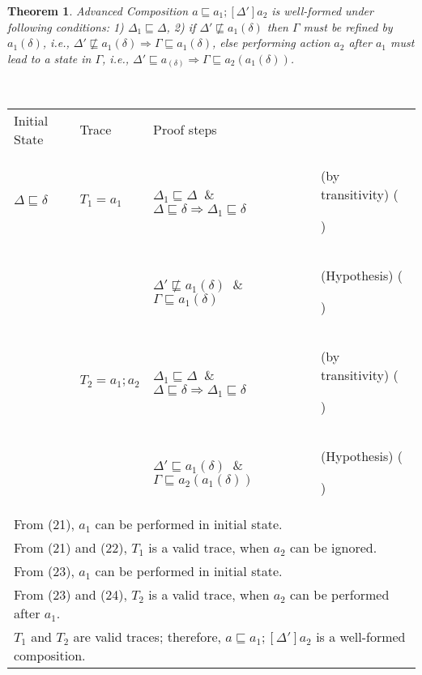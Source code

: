 \documentclass[12pt,journal,letterpaper,onecolumn]{IEEEtran}
\newcounter{myCounter}
\renewcommand{\themyCounter}{\arabic{myCounter}\addtocounter{myCounter}{1}}
\newtheorem{theorem}{Theorem}[section]
\begin{document}
\begin{theorem}
Advanced Composition $a\sqsubseteq a_1;[\Delta']a_2$ is well-formed
under following conditions: 1) $\Delta_1 \sqsubseteq \Delta$, 2) if
$\Delta' \not \sqsubseteq a_1(\delta)$ then $\Gamma$ must be refined
by $a_1(\delta)$, i.e., $\Delta' \not \sqsubseteq a_1(\delta)
\Rightarrow \Gamma \sqsubseteq a_1(\delta)$, else performing action
$a_2$ after $a_1$ must lead to a state in $\Gamma$, i.e., $\Delta'
\sqsubseteq a_(\delta) \Rightarrow \Gamma \sqsubseteq
a_2(a_1(\delta))$. \label{theorem:advancedseq} \end{theorem}
\\
\begin{minipage}{6in} \begin{center}
\begin{tabular}{llp{7.5cm}p{3.8cm}}
Initial State & Trace &  Proof steps & \\
$\Delta \sqsubseteq \delta$ & $T_1 = a_1$ & $\Delta_1 \sqsubseteq \Delta $ $~\&~$ $ \Delta \sqsubseteq \delta \Rightarrow \Delta_1 \sqsubseteq \delta $& (by transitivity) \hfill(\themyCounter) \\
& & $\Delta' \not \sqsubseteq a_1(\delta)$ $~\&~$ $\Gamma \sqsubseteq a_1(\delta)$ & (Hypothesis) \hfill(\themyCounter)\\
& $T_2 = a_1;a_2$ &  $\Delta_1 \sqsubseteq \Delta $ $~\&~$ $ \Delta \sqsubseteq \delta \Rightarrow \Delta_1 \sqsubseteq \delta $& (by transitivity) \hfill(\themyCounter)\\
& & $\Delta' \sqsubseteq a_1(\delta)$ $~\&~$ $\Gamma \sqsubseteq a_2(a_1(\delta))$& (Hypothesis) \hfill(\themyCounter)\\
\multicolumn{4}{l}{From (21), $a_1$ can be performed in initial state.}\\
\multicolumn{4}{l}{From (21) and (22), $T_1$ is a valid trace, when $a_2$ can be ignored.}\\
\multicolumn{4}{l}{From (23), $a_1$ can be performed in initial state.}\\
\multicolumn{4}{l}{From (23) and (24), $T_2$ is a valid trace, when $a_2$ can be performed after $a_1$. }\\
\multicolumn{4}{l}{$T_1$ and $T_2$ are valid traces; therefore,
$a\sqsubseteq a_1;[\Delta']a_2$ is a well-formed composition.}
\hfill$\Box$
\end{tabular}
\end{center}
\end{minipage}\\
\end{document}
